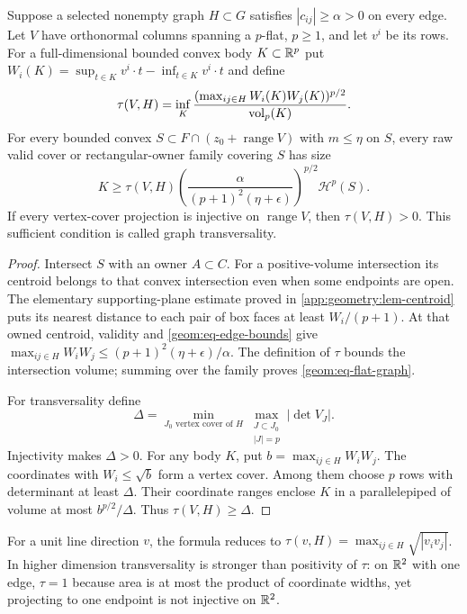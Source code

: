 \begin{theorem}\label{geom:thm-flat-graph}
Suppose a selected nonempty graph $H\subset G$ satisfies
$|c_{ij}|\geq\alpha>0$ on every edge. Let $V$ have orthonormal columns
spanning a $p$-flat, $p\geq1$, and let $v^i$ be its rows. For a
full-dimensional bounded convex body $K\subset\mathbb{R}^p$ put
$W_i(K)=\sup_{t\in K}v^i\cdot t-\inf_{t\in K}v^i\cdot t$ and define
\[
 \tau(V,H)=\inf_K
   \frac{(\max_{ij\in H}W_i(K)W_j(K))^{p/2}}{\operatorname{vol}_p(K)}.
\]
For every bounded convex $S\subset F\cap(z_0+\operatorname{range}V)$
with $m\leq\eta$ on $S$, every raw valid cover or rectangular-owner
family covering $S$ has size
\begin{equation}\label{geom:eq-flat-graph}
 K\geq\tau(V,H)
   \left(\frac{\alpha}{(p+1)^2(\eta+\epsilon)}\right)^{p/2}
                                                     \mathcal H^p(S).
\end{equation}
If every vertex-cover projection is injective on $\operatorname{range}V$,
then $\tau(V,H)>0$. This sufficient condition is called graph
transversality.
\end{theorem}
\begin{proof}
Intersect $S$ with an owner $A\subset C$. For a positive-volume
intersection its centroid belongs to that convex intersection even
when some endpoints are open. The elementary supporting-plane estimate
proved in \cref{app:geometry:lem-centroid} puts its nearest distance to
each pair of box faces at least $W_i/(p+1)$. At that owned centroid,
validity and \cref{geom:eq-edge-bounds} give
$\max_{ij\in H}W_iW_j\leq(p+1)^2(\eta+\epsilon)/\alpha$.
The definition of $\tau$ bounds the intersection volume; summing
over the family proves \cref{geom:eq-flat-graph}.

For transversality define
\[
 \Delta=\min_{J_0\text{ vertex cover of }H}
           \max_{\substack{J\subset J_0\\|J|=p}}|\det V_J|.
\]
Injectivity makes $\Delta>0$. For any body $K$, put
$b=\max_{ij\in H}W_iW_j$. The coordinates with $W_i\leq\sqrt b$
form a vertex cover. Among them choose $p$ rows with determinant at
least $\Delta$. Their coordinate ranges enclose $K$ in a parallelepiped
of volume at most $b^{p/2}/\Delta$. Thus $\tau(V,H)\geq\Delta$.
\end{proof}

For a unit line direction $v$, the formula reduces to
$\tau(v,H)=\max_{ij\in H}\sqrt{|v_iv_j|}$. In higher dimension
transversality is stronger than positivity of $\tau$: on $\mathbb{R}^2$ with
one edge, $\tau=1$ because area is at most the product of coordinate
widths, yet projecting to one endpoint is not injective on $\mathbb{R}^2$.

